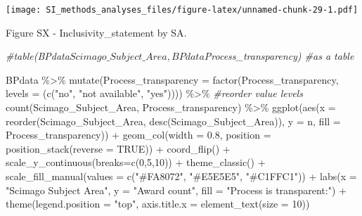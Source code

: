 \documentclass[
]{article}
\newenvironment{Shaded}{\begin{snugshade}}{\end{snugshade}}
\newcommand{\AttributeTok}[1]{\textcolor[rgb]{0.77,0.63,0.00}{#1}}
\newcommand{\CommentTok}[1]{\textcolor[rgb]{0.56,0.35,0.01}{\textit{#1}}}
\newcommand{\ConstantTok}[1]{\textcolor[rgb]{0.00,0.00,0.00}{#1}}
\newcommand{\DecValTok}[1]{\textcolor[rgb]{0.00,0.00,0.81}{#1}}
\newcommand{\FloatTok}[1]{\textcolor[rgb]{0.00,0.00,0.81}{#1}}
\newcommand{\FunctionTok}[1]{\textcolor[rgb]{0.00,0.00,0.00}{#1}}
\newcommand{\NormalTok}[1]{#1}
\newcommand{\SpecialCharTok}[1]{\textcolor[rgb]{0.00,0.00,0.00}{#1}}
\newcommand{\StringTok}[1]{\textcolor[rgb]{0.31,0.60,0.02}{#1}}
\begin{document}
\texttt{[image: SI\_methods\_analyses\_files/figure-latex/unnamed-chunk-29-1.pdf]}

Figure SX - Inclusivity\_statement by SA.

\begin{Shaded}
\begin{Highlighting}[]
\CommentTok{\#table(BPdata$Scimago\_Subject\_Area, BPdata$Process\_transparency) \#as a table}

\NormalTok{BPdata }\SpecialCharTok{\%\textgreater{}\%} 
    \FunctionTok{mutate}\NormalTok{(}\AttributeTok{Process\_transparency =} \FunctionTok{factor}\NormalTok{(Process\_transparency, }\AttributeTok{levels =}\NormalTok{ (}\FunctionTok{c}\NormalTok{(}\StringTok{"no"}\NormalTok{, }\StringTok{"not available"}\NormalTok{, }\StringTok{"yes"}\NormalTok{)))) }\SpecialCharTok{\%\textgreater{}\%} \CommentTok{\#reorder value levels}
    \FunctionTok{count}\NormalTok{(Scimago\_Subject\_Area, Process\_transparency) }\SpecialCharTok{\%\textgreater{}\%}
    \FunctionTok{ggplot}\NormalTok{(}\FunctionTok{aes}\NormalTok{(}\AttributeTok{x =} \FunctionTok{reorder}\NormalTok{(Scimago\_Subject\_Area, }\FunctionTok{desc}\NormalTok{(Scimago\_Subject\_Area)), }\AttributeTok{y =}\NormalTok{ n, }\AttributeTok{fill =}\NormalTok{ Process\_transparency)) }\SpecialCharTok{+} 
    \FunctionTok{geom\_col}\NormalTok{(}\AttributeTok{width =} \FloatTok{0.8}\NormalTok{, }\AttributeTok{position =} \FunctionTok{position\_stack}\NormalTok{(}\AttributeTok{reverse =} \ConstantTok{TRUE}\NormalTok{)) }\SpecialCharTok{+}
    \FunctionTok{coord\_flip}\NormalTok{() }\SpecialCharTok{+}
    \FunctionTok{scale\_y\_continuous}\NormalTok{(}\AttributeTok{breaks=}\FunctionTok{c}\NormalTok{(}\DecValTok{0}\NormalTok{,}\DecValTok{5}\NormalTok{,}\DecValTok{10}\NormalTok{)) }\SpecialCharTok{+}
    \FunctionTok{theme\_classic}\NormalTok{() }\SpecialCharTok{+} 
    \FunctionTok{scale\_fill\_manual}\NormalTok{(}\AttributeTok{values =} \FunctionTok{c}\NormalTok{(}\StringTok{"\#FA8072"}\NormalTok{, }\StringTok{"\#E5E5E5"}\NormalTok{, }\StringTok{"\#C1FFC1"}\NormalTok{)) }\SpecialCharTok{+}
    \FunctionTok{labs}\NormalTok{(}\AttributeTok{x =} \StringTok{"Scimago Subject Area"}\NormalTok{, }\AttributeTok{y =} \StringTok{"Award count"}\NormalTok{, }\AttributeTok{fill =} \StringTok{"Process is transparent:"}\NormalTok{) }\SpecialCharTok{+} 
    \FunctionTok{theme}\NormalTok{(}\AttributeTok{legend.position =} \StringTok{"top"}\NormalTok{, }\AttributeTok{axis.title.x =} \FunctionTok{element\_text}\NormalTok{(}\AttributeTok{size =} \DecValTok{10}\NormalTok{))}
\end{Highlighting}
\end{Shaded}
\end{document}
